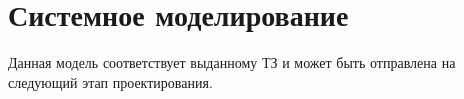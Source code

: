 \chapter{Системное моделирование} \label{chap:system_modeling}



Данная модель соответствует выданному ТЗ и может быть отправлена на следующий 
этап проектирования.
